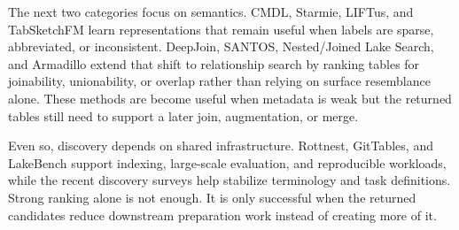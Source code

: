 \documentclass[sigconf]{acmart}
\begin{document}
The next two categories focus on semantics. CMDL, Starmie, LIFTus, and TabSketchFM learn representations that remain useful when labels are sparse, abbreviated, or inconsistent. DeepJoin, SANTOS, Nested/Joined Lake Search, and Armadillo extend that shift to relationship search by ranking tables for joinability, unionability, or overlap rather than relying on surface resemblance alone. These methods are become useful when metadata is weak but the returned tables still need to support a later join, augmentation, or merge.

Even so, discovery depends on shared infrastructure. Rottnest, GitTables, and LakeBench support indexing, large-scale evaluation, and reproducible workloads, while the recent discovery surveys help stabilize terminology and task definitions. Strong ranking alone is not enough. It is only successful when the returned candidates reduce downstream preparation work instead of creating more of it.
\end{document}
